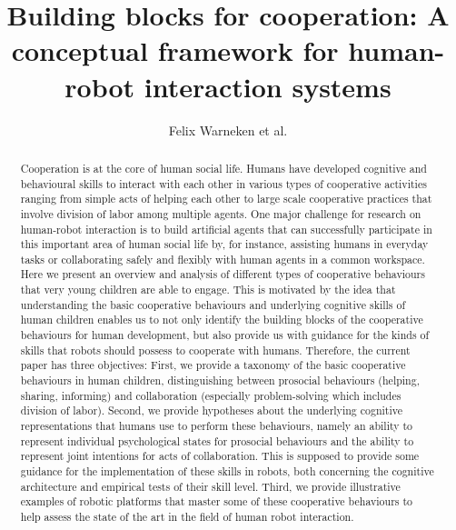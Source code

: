 \documentclass{article}
\title{Building blocks for cooperation: A conceptual framework for human-robot interaction systems}
\author{Felix Warneken et al.}
\begin{document}
\maketitle
\tableofcontents

\begin{abstract}

Cooperation is at the core of human social life. Humans have developed
cognitive and behavioural skills to interact with each other in various types of
cooperative activities ranging from simple acts of helping each other to large
scale cooperative practices that involve division of labor among multiple
agents. One major challenge for research on human-robot interaction is to build
artificial agents that can successfully participate in this important area of
human social life by, for instance, assisting humans in everyday tasks or
collaborating safely and flexibly with human agents in a common workspace. Here
we present an overview and analysis of different types of cooperative behaviours
that very young children are able to engage. This is motivated by the idea that
understanding the basic cooperative behaviours and underlying cognitive skills
of human children enables us to not only identify the building blocks of the
cooperative behaviours for human development, but also provide us with guidance
for the kinds of skills that robots should possess to cooperate with humans.
Therefore, the current paper has three objectives: First, we provide a
taxonomy of the basic cooperative behaviours in human children,
distinguishing between prosocial behaviours (helping, sharing, informing)
and collaboration (especially problem-solving which includes division of
labor). Second, we provide hypotheses about the underlying cognitive
representations that humans use to perform these behaviours, namely an
ability to represent individual psychological states for prosocial
behaviours and the ability to represent joint intentions for acts of
collaboration. This is supposed to provide some guidance for the
implementation of these skills in robots, both concerning the cognitive
architecture and empirical tests of their skill level. Third, we provide
illustrative examples of robotic platforms that master some of these
cooperative behaviours to help assess the state of the art in the field of
human robot interaction.

\end{abstract}

\end{document}
